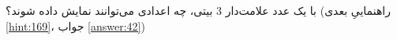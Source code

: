 \section{}
\paragraph{}\label{hint:167}
با یک عدد علامت‌دار 3 بیتی، چه اعدادی می‌توانند نمایش داده شوند؟ (راهنماییِ بعدی \ref{hint:169}، جواب \ref{answer:42})